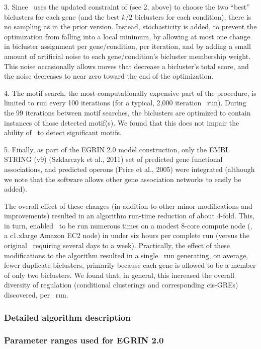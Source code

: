3. Since \cm\ uses the updated constraint of (see 2, above) to
choose the two ``best'' biclusters for each gene (and the best $k/2$
biclusters for each condition), there is no sampling as in the prior
version. Instead, stochasticity is added, to prevent the optimization
from falling into a local minimum, by allowing at most one change in
bicluster assignment per gene/condition, per iteration, and by adding
a small amount of artificial noise to each gene/condition's
bicluster membership weight. This noise occasionally allows moves that
decrease a bicluster's total score, and the noise decreases to near
zero toward the end of the optimization.

4. The motif search, the most computationally expensive part of the
procedure, is limited to run every 100 iterations (for a typical,
2,000 iteration \cm\ run). During the 99 iterations between motif
searches, the biclusters are optimized to contain instances of those
detected motif(s). We found that this does not impair the ability of
\cm\ to detect significant motifs.

5. Finally, as part of the EGRIN 2.0 model construction, only the EMBL
STRING (v9) (Szklarczyk et al., 2011) set of predicted gene functional
associations, and predicted operons (Price et al., 2005) were
integrated (although we note that the software allows other gene
association networks to easily be added).

The overall effect of these changes (in addition to other minor
modifications and improvements) resulted in an algorithm run-time
reduction of about 4-fold. This, in turn, enabled \cm\ to be run
numerous times on a modest 8-core compute node (\eg, a c1.xlarge
Amazon EC2 node) in under six hours per complete run (versus the
original \cm\ requiring several days to a week). Practically, the
effect of these modifications to the algorithm resulted in a single
\cm\ run generating, on average, fewer duplicate biclusters,
primarily because each gene is allowed to be a member of only two
biclusters. We found that, in general, this increased the overall
diversity of regulation (conditional clusterings and corresponding
cis-GREs) discovered, per \cm\ run.

\subsubsection{Detailed algorithm description}

\subsubsection{Parameter ranges used for EGRIN 2.0}

